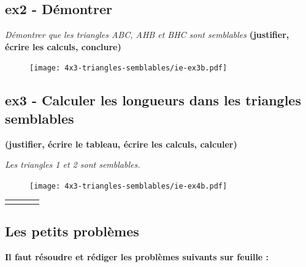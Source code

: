 \begin{minipage}[t]{0.55\textwidth}
  \subsection*{ex2 - Démontrer}
  \textit{Démontrer que les triangles ABC, AHB et BHC sont semblables}
  \textbf{(justifier, écrire les calculs, conclure)}
  \begin{figure}[H]
    \centering
    \texttt{[image: 4x3-triangles-semblables/ie-ex3b.pdf]}
  \end{figure}
\end{minipage}
\begin{minipage}[t]{0.4\textwidth}
  \Pointilles[14]
\end{minipage}

\newpage

\subsection*{ex3 - Calculer les longueurs dans les triangles semblables}
\textbf{(justifier, écrire le tableau, écrire les calculs, calculer)} \newline
\begin{minipage}[t]{0.45\textwidth}
  \textit{Les triangles 1 et 2 sont semblables.} 
  \begin{figure}[H]
    \centering
    \texttt{[image: 4x3-triangles-semblables/ie-ex4b.pdf]}
  \end{figure}
\end{minipage}
\begin{minipage}[t]{0.55\textwidth}
  \begin{tabular}{|c|c|c|c|}
    \hline
    \phantom{$\dfrac{azerty}{1}$} & \phantom{azerty}  & \phantom{azerty} & \phantom{azerty} \\ \hline
    \phantom{$\dfrac{azerty}{1}$} & \phantom{azerty}  & \phantom{azerty} & \phantom{azerty} \\   \hline
  \end{tabular}

  \Pointilles[6]
\end{minipage}


\subsection*{Les petits problèmes}
\textbf{Il faut résoudre et rédiger les problèmes suivants sur feuille :} 

